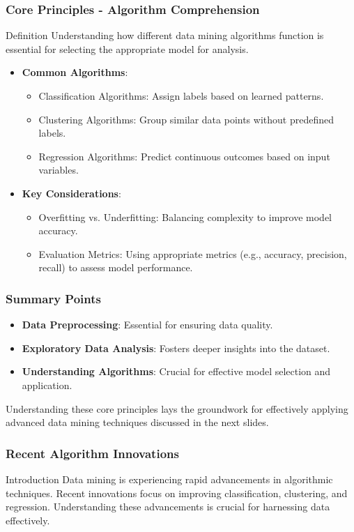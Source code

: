 \documentclass{beamer}
\begin{document}
\begin{frame}[fragile]
    \frametitle{Core Principles - Algorithm Comprehension}
    \begin{block}{Definition}
        Understanding how different data mining algorithms function is essential for selecting the appropriate model for analysis.
    \end{block}
    \begin{itemize}
        \item \textbf{Common Algorithms}:
        \begin{itemize}
            \item Classification Algorithms: Assign labels based on learned patterns.
            \item Clustering Algorithms: Group similar data points without predefined labels.
            \item Regression Algorithms: Predict continuous outcomes based on input variables.
        \end{itemize}
        \item \textbf{Key Considerations}:
        \begin{itemize}
            \item Overfitting vs. Underfitting: Balancing complexity to improve model accuracy.
            \item Evaluation Metrics: Using appropriate metrics (e.g., accuracy, precision, recall) to assess model performance.
        \end{itemize}
    \end{itemize}
\end{frame}

\begin{frame}[fragile]
    \frametitle{Summary Points}
    \begin{itemize}
        \item \textbf{Data Preprocessing}: Essential for ensuring data quality.
        \item \textbf{Exploratory Data Analysis}: Fosters deeper insights into the dataset.
        \item \textbf{Understanding Algorithms}: Crucial for effective model selection and application.
    \end{itemize}
    Understanding these core principles lays the groundwork for effectively applying advanced data mining techniques discussed in the next slides.
\end{frame}

\begin{frame}[fragile]
    \frametitle{Recent Algorithm Innovations}
    \begin{block}{Introduction}
        Data mining is experiencing rapid advancements in algorithmic techniques. Recent innovations focus on improving classification, clustering, and regression. Understanding these advancements is crucial for harnessing data effectively.
    \end{block}
\end{frame}
\end{document}
